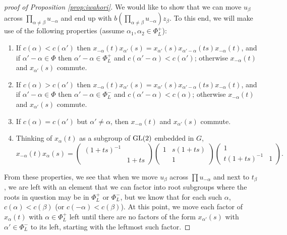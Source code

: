 \documentclass[11pt,letterpaper]{article}
\newcommand{\GL}{\textup{GL}}
\theoremstyle{remark}
\numberwithin{equation}{section}
\begin{document}
\begin{proof}[proof of Proposition \ref{prop:iwahori}]
We would like to show that we can move $u_{\beta}$ across $\prod_{\alpha \neq \beta} u_{-\alpha}$ and end up with $b\left(\prod_{\alpha \neq \beta} u_{-\alpha}\right)z_{\beta}$. To this end, we will make use of the following properties (assume $\alpha_1,\alpha_2 \in \Phi_L^+$):

\begin{enumerate}
\item \label{fact1} If $c(\alpha)< c(\alpha')$ then $x_{-\alpha}(t)x_{\alpha'}(s) = x_{\alpha'}(s)x_{\alpha'-\alpha}(ts)x_{-\alpha}(t)$, and if $\alpha'-\alpha \in \Phi$ then $\alpha'-\alpha \in \Phi_L^+$ and $c(\alpha'-\alpha) < c(\alpha')$; otherwise $x_{-\alpha}(t)$ and $x_{\alpha'}(s)$ commute.
\item If $c(\alpha)> c(\alpha')$ then $x_{-\alpha}(t)x_{\alpha'}(s) = x_{\alpha'}(s)x_{\alpha'-\alpha}(ts)x_{-\alpha}(t)$, and if $\alpha'-\alpha \in \Phi$ then $\alpha'-\alpha \in \Phi_L^-$ and $c(\alpha'-\alpha) < c(\alpha)$; otherwise $x_{-\alpha}(t)$ and $x_{\alpha'}(s)$ commute.
\item If $c(\alpha) = c(\alpha')$ but $\alpha'\neq \alpha$, then $x_{-\alpha}(t)$ and $x_{\alpha'}(s)$ commute.
\item Thinking of $x_{\alpha}(t)$ as a subgroup of $\GL(2)$ embedded in $G$, $$x_{-\alpha}(t)x_{\alpha}(s) = \begin{pmatrix} (1+ts)^{-1} & \\  & 1+ts\end{pmatrix} \begin{pmatrix} 1 & s(1+ts) \\ & 1 \end{pmatrix} \begin{pmatrix} 1 &  \\ t(1+ts)^{-1} & 1 \end{pmatrix}.$$
\end{enumerate}



From these properties, we see that when we move $u_{\beta}$ across $\prod u_{-\alpha}$ and next to $t_{\beta}$, we are left with an element that we can factor into root subgroups where the roots in question may be in $\Phi_L^+$ or $\Phi_L^-$, but we know that for each such $\alpha$, $c(\alpha) < c(\beta)$ (or $c(-\alpha) < c(\beta)$). At this point, we move each factor of $x_{\alpha}(t)$ with $\alpha \in \Phi_L^+$ left until there are no factors of the form $x_{\alpha'}(s)$ with $\alpha' \in \Phi_L^-$ to its left, starting with the leftmost such factor. 


\end{proof}
\end{document}
